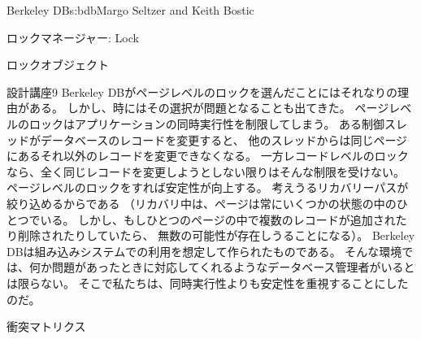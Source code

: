 \begin{aosachapter}{Berkeley DB}{s:bdb}{Margo Seltzer and Keith Bostic}
\begin{aosasect1}{ロックマネージャー: Lock}
\begin{aosasect2}{ロックオブジェクト}
\begin{aosabox}{設計講座9}
Berkeley DBがページレベルのロックを選んだことにはそれなりの理由がある。
しかし、時にはその選択が問題となることも出てきた。
ページレベルのロックはアプリケーションの同時実行性を制限してしまう。
ある制御スレッドがデータベースのレコードを変更すると、
他のスレッドからは同じページにあるそれ以外のレコードを変更できなくなる。
一方レコードレベルのロックなら、全く同じレコードを変更しようとしない限りはそんな制限を受けない。
ページレベルのロックをすれば安定性が向上する。
考えうるリカバリーパスが絞り込めるからである
（リカバリ中は、ページは常にいくつかの状態の中のひとつでいる。
しかし、もしひとつのページの中で複数のレコードが追加されたり削除されたりしていたら、
無数の可能性が存在しうることになる）。
Berkeley DBは組み込みシステムでの利用を想定して作られたものである。
そんな環境では、何か問題があったときに対応してくれるようなデータベース管理者がいるとは限らない。
そこで私たちは、同時実行性よりも安定性を重視することにしたのだ。

\end{aosabox}

\end{aosasect2}

\begin{aosasect2}{衝突マトリクス}


\end{aosasect2}
\end{aosasect1}
\end{aosachapter}
